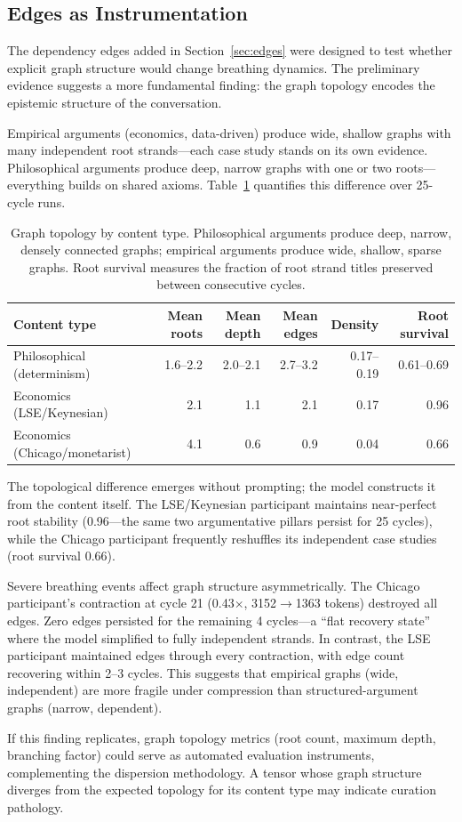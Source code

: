 \subsection{Edges as Instrumentation}

The dependency edges added in Section~\ref{sec:edges} were designed to test
whether explicit graph structure would change breathing dynamics. The
preliminary evidence suggests a more fundamental finding: the graph topology
encodes the epistemic structure of the conversation.

Empirical arguments (economics, data-driven) produce wide, shallow graphs
with many independent root strands---each case study stands on its own
evidence. Philosophical arguments produce deep, narrow graphs with one or
two roots---everything builds on shared axioms. Table~\ref{tab:topology}
quantifies this difference over 25-cycle runs.

\begin{table}[h]
\centering
\caption{Graph topology by content type. Philosophical arguments produce
deep, narrow, densely connected graphs; empirical arguments produce wide,
shallow, sparse graphs. Root survival measures the fraction of root strand
titles preserved between consecutive cycles.}
\label{tab:topology}
\begin{tabular}{lrrrrr}
\toprule
Content type & Mean roots & Mean depth & Mean edges & Density & Root survival \\
\midrule
Philosophical (determinism) & 1.6--2.2 & 2.0--2.1 & 2.7--3.2 & 0.17--0.19 & 0.61--0.69 \\
Economics (LSE/Keynesian) & 2.1 & 1.1 & 2.1 & 0.17 & 0.96 \\
Economics (Chicago/monetarist) & 4.1 & 0.6 & 0.9 & 0.04 & 0.66 \\
\bottomrule
\end{tabular}
\end{table}

The topological difference emerges without prompting; the model constructs
it from the content itself. The LSE/Keynesian participant maintains
near-perfect root stability (0.96---the same two argumentative pillars
persist for 25 cycles), while the Chicago participant frequently reshuffles
its independent case studies (root survival 0.66).

Severe breathing events affect graph structure asymmetrically. The Chicago
participant's contraction at cycle 21 (0.43$\times$, 3152$\rightarrow$1363
tokens) destroyed all edges. Zero edges persisted for the remaining 4
cycles---a ``flat recovery state'' where the model simplified to fully
independent strands. In contrast, the LSE participant maintained edges
through every contraction, with edge count recovering within 2--3 cycles.
This suggests that empirical graphs (wide, independent) are more fragile
under compression than structured-argument graphs (narrow, dependent).

If this finding replicates, graph topology metrics (root count, maximum
depth, branching factor) could serve as automated evaluation instruments,
complementing the dispersion methodology. A tensor whose graph structure
diverges from the expected topology for its content type may indicate
curation pathology.
